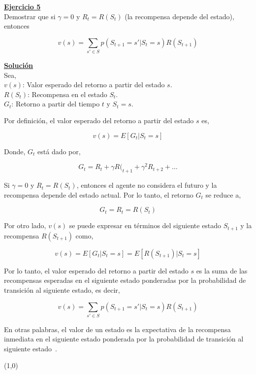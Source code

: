 \indent\underline{\textbf{Ejercicio 5}}\\
Demostrar que si $\gamma = 0$ y $R_t = R(S_t)$ (la recompensa depende del estado), entonces

\[
    v(s) = \sum_{s' \in S} p(S_{t+1} = s' | S_t = s) R(S_{t+1})
\]

\indent\underline{\textbf{Solución}}\\
Sea,\\
$v(s)$: Valor esperado del retorno a partir del estado $s$.\\
$R(S_t)$: Recompensa en el estado $S_t$.\\
$G_t$: Retorno a partir del tiempo $t$ y $S_t = s$.

Por definición, el valor esperado del retorno a partir del estado $s$ es,

\[
    v(s) = E[G_t | S_t = s]
\]

Donde, $G_t$ está dado por,

\[
    G_t = R_t + \gamma R(_{t+1} + \gamma^2 R_{t+2} + \ldots
\]

Si $\gamma = 0$ y $R_t = R(S_t)$, entonces el agente no considera el futuro y la recompensa depende del estado actual.
Por lo tanto, el retorno $G_t$ se reduce a,

\[
    G_t = R_t = R(S_t)
\]

Por otro lado, $v(s)$ se puede expresar en términos del siguiente estado $S_{t+1}$ y la recompensa $R(S_{t+1})$ como,

\[
    v(s) = E[G_t | S_t = s] = E[R(S_{t+1}) | S_t = s]
\]

Por lo tanto, el valor esperado del retorno a partir del estado $s$ es la suma de las recompensas esperadas en el siguiente estado ponderadas por la probabilidad de transición al siguiente estado, es decir,

\[
    v(s) = \sum_{s' \in S} p(S_{t+1} = s' | S_t = s) R(S_{t+1})
\]

En otras palabras, el valor de un estado es la expectativa de la recompensa inmediata en el siguiente estado ponderada por la probabilidad de transición al siguiente estado~\cite{Sutton2018}.

\line(1,0){\textwidth}

